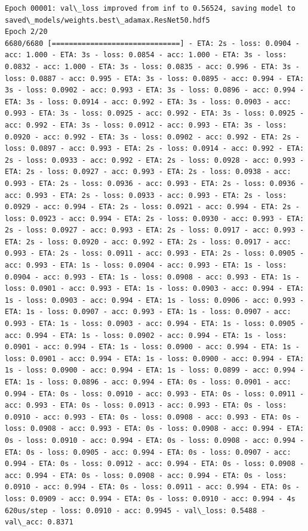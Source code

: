 \documentclass[11pt]{article}
\begin{document}
\begin{Verbatim}[commandchars=\\\{\}]
Epoch 00001: val\_loss improved from inf to 0.56524, saving model to saved\_models/weights.best\_adamax.ResNet50.hdf5
Epoch 2/20
6680/6680 [==============================] - ETA: 2s - loss: 0.0904 - acc: 1.000 - ETA: 3s - loss: 0.0854 - acc: 1.000 - ETA: 3s - loss: 0.0832 - acc: 1.000 - ETA: 3s - loss: 0.0835 - acc: 0.996 - ETA: 3s - loss: 0.0887 - acc: 0.995 - ETA: 3s - loss: 0.0895 - acc: 0.994 - ETA: 3s - loss: 0.0902 - acc: 0.993 - ETA: 3s - loss: 0.0896 - acc: 0.994 - ETA: 3s - loss: 0.0914 - acc: 0.992 - ETA: 3s - loss: 0.0903 - acc: 0.993 - ETA: 3s - loss: 0.0925 - acc: 0.992 - ETA: 3s - loss: 0.0925 - acc: 0.992 - ETA: 3s - loss: 0.0912 - acc: 0.993 - ETA: 3s - loss: 0.0920 - acc: 0.992 - ETA: 3s - loss: 0.0902 - acc: 0.992 - ETA: 2s - loss: 0.0897 - acc: 0.993 - ETA: 2s - loss: 0.0914 - acc: 0.992 - ETA: 2s - loss: 0.0933 - acc: 0.992 - ETA: 2s - loss: 0.0928 - acc: 0.993 - ETA: 2s - loss: 0.0927 - acc: 0.993 - ETA: 2s - loss: 0.0938 - acc: 0.993 - ETA: 2s - loss: 0.0936 - acc: 0.993 - ETA: 2s - loss: 0.0936 - acc: 0.993 - ETA: 2s - loss: 0.0933 - acc: 0.993 - ETA: 2s - loss: 0.0929 - acc: 0.994 - ETA: 2s - loss: 0.0921 - acc: 0.994 - ETA: 2s - loss: 0.0923 - acc: 0.994 - ETA: 2s - loss: 0.0930 - acc: 0.993 - ETA: 2s - loss: 0.0927 - acc: 0.993 - ETA: 2s - loss: 0.0917 - acc: 0.993 - ETA: 2s - loss: 0.0920 - acc: 0.992 - ETA: 2s - loss: 0.0917 - acc: 0.993 - ETA: 2s - loss: 0.0911 - acc: 0.993 - ETA: 2s - loss: 0.0905 - acc: 0.993 - ETA: 1s - loss: 0.0904 - acc: 0.993 - ETA: 1s - loss: 0.0904 - acc: 0.993 - ETA: 1s - loss: 0.0908 - acc: 0.993 - ETA: 1s - loss: 0.0901 - acc: 0.993 - ETA: 1s - loss: 0.0903 - acc: 0.994 - ETA: 1s - loss: 0.0903 - acc: 0.994 - ETA: 1s - loss: 0.0906 - acc: 0.993 - ETA: 1s - loss: 0.0907 - acc: 0.993 - ETA: 1s - loss: 0.0907 - acc: 0.993 - ETA: 1s - loss: 0.0903 - acc: 0.994 - ETA: 1s - loss: 0.0905 - acc: 0.994 - ETA: 1s - loss: 0.0902 - acc: 0.994 - ETA: 1s - loss: 0.0901 - acc: 0.994 - ETA: 1s - loss: 0.0900 - acc: 0.994 - ETA: 1s - loss: 0.0901 - acc: 0.994 - ETA: 1s - loss: 0.0900 - acc: 0.994 - ETA: 1s - loss: 0.0900 - acc: 0.994 - ETA: 1s - loss: 0.0899 - acc: 0.994 - ETA: 1s - loss: 0.0896 - acc: 0.994 - ETA: 0s - loss: 0.0901 - acc: 0.994 - ETA: 0s - loss: 0.0910 - acc: 0.993 - ETA: 0s - loss: 0.0911 - acc: 0.993 - ETA: 0s - loss: 0.0913 - acc: 0.993 - ETA: 0s - loss: 0.0910 - acc: 0.993 - ETA: 0s - loss: 0.0908 - acc: 0.993 - ETA: 0s - loss: 0.0908 - acc: 0.993 - ETA: 0s - loss: 0.0908 - acc: 0.994 - ETA: 0s - loss: 0.0910 - acc: 0.994 - ETA: 0s - loss: 0.0908 - acc: 0.994 - ETA: 0s - loss: 0.0905 - acc: 0.994 - ETA: 0s - loss: 0.0907 - acc: 0.994 - ETA: 0s - loss: 0.0912 - acc: 0.994 - ETA: 0s - loss: 0.0908 - acc: 0.994 - ETA: 0s - loss: 0.0908 - acc: 0.994 - ETA: 0s - loss: 0.0910 - acc: 0.994 - ETA: 0s - loss: 0.0911 - acc: 0.994 - ETA: 0s - loss: 0.0909 - acc: 0.994 - ETA: 0s - loss: 0.0910 - acc: 0.994 - 4s 620us/step - loss: 0.0910 - acc: 0.9945 - val\_loss: 0.5488 - val\_acc: 0.8371


\end{Verbatim}
\end{document}
